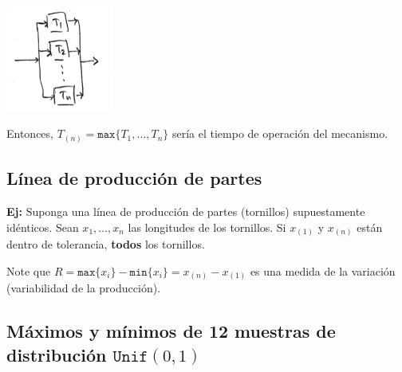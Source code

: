 \documentclass[]{book}
\begin{document}
\begin{center}\includegraphics[width=100pt]{imgs/estadord_ej_compparalelo} \end{center}

Entonces, \(T_{(n)} = \texttt{max}\{T_1, \ldots, T_n\}\) sería el tiempo de operación del mecanismo.

\hypertarget{luxednea-de-producciuxf3n-de-partes}{%
\subsection{Línea de producción de partes}\label{luxednea-de-producciuxf3n-de-partes}}

\textbf{Ej:} Suponga una línea de producción de partes (tornillos) supuestamente idénticos. Sean \(x_1, \ldots, x_n\) las longitudes de los tornillos. Si \(x_{(1)}\) y \(x_{(n)}\) están dentro de tolerancia, \textbf{todos} los tornillos.

Note que \(R = \texttt{max}\{x_i\} - \texttt{min}\{x_i\} = x_{(n)}- x_{(1)}\) es una medida de la variación (variabilidad de la producción).

\hypertarget{muxe1ximos-y-muxednimos-de-12-muestras-de-distribuciuxf3n-textttunif-01}{%
\subsection{\texorpdfstring{Máximos y mínimos de 12 muestras de distribución \(\texttt{Unif} (0,1)\)}{Máximos y mínimos de 12 muestras de distribución \textbackslash{}texttt\{Unif\} (0,1)}}\label{muxe1ximos-y-muxednimos-de-12-muestras-de-distribuciuxf3n-textttunif-01}}
\end{document}
